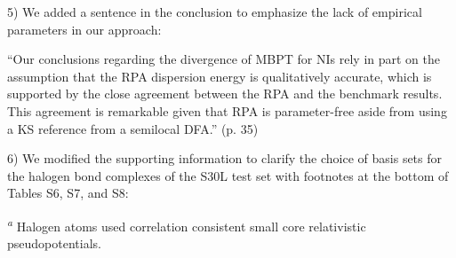 \documentclass[journal=jctcce,manuscript=article]{achemso}
\newcommand*{\rev}[1]{{\color{blue} #1}}
\begin{document}
5) We added a sentence in the conclusion to emphasize
  the lack of empirical parameters in our approach:

``Our conclusions regarding the divergence of MBPT for NIs
  rely in part on the assumption that the RPA dispersion energy is
  qualitatively accurate, which is supported by the close agreement
  between the RPA and the benchmark results. \rev{This agreement is
    remarkable given that RPA is parameter-free aside from using
    a KS reference from a semilocal DFA.}'' (p. 35)

6) We modified the supporting information to clarify the choice of basis sets for the halogen
  bond complexes of the S30L\cite{Sure15JChemTheoryComput} test set with footnotes at the bottom of
  Tables S6, S7, and S8:

\rev{\textsuperscript{\emph{a}} Halogen
    atoms used correlation consistent small core relativistic
    pseudopotentials.\cite{doi:10.1063/1.1622924,doi:10.1021/jp065887l}}


\end{document}
